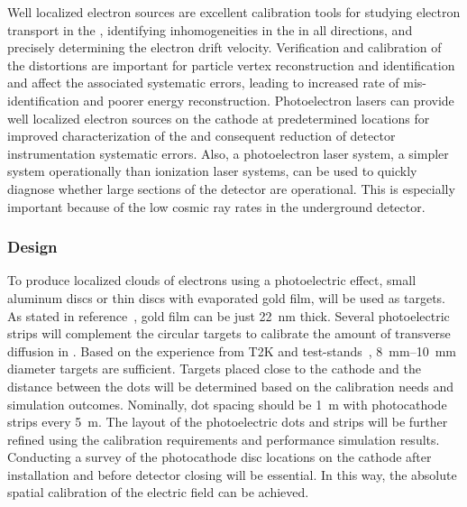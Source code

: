 Well localized electron sources are excellent calibration tools for studying electron transport in the , identifying inhomogeneities in the \efield in all directions, and precisely determining the electron drift velocity. Verification and calibration of the \efield distortions are important for particle vertex reconstruction and identification and affect the associated systematic errors, leading to increased rate of mis-identification and poorer energy reconstruction. Photoelectron lasers can provide well localized electron sources on the cathode at predetermined locations for improved characterization of the \efield and consequent reduction of detector instrumentation systematic errors. Also, a photoelectron laser system, a simpler system operationally than ionization laser systems, can be used to quickly diagnose whether large sections of the detector are operational.
This is especially important because of the low cosmic ray rates in the underground detector. 

\subsubsection{Design}
\label{sec:dp-calib-sys-las-pe-des}

To produce localized clouds of electrons using a photoelectric effect, small aluminum discs or thin discs with evaporated gold film, will be used as targets. As stated in reference~\cite{Li:2016ods}, gold film can be just \SI{22}{\nano\m} thick. Several photoelectric strips will complement the circular targets to calibrate the amount of transverse diffusion in . Based on the experience from T2K and   test-stands~\cite{Li:2016ods}, \SIrange{8}{10}{\milli\m} diameter targets are sufficient. Targets placed close to the cathode and the distance between the dots will be determined based on the calibration needs and simulation outcomes. Nominally, dot spacing should be \SI{1}{\m} with photocathode strips every \SI{5}{\m}. The layout of the photoelectric dots and strips will be further refined using the calibration requirements and performance simulation results.  Conducting a survey of the photocathode disc locations on the cathode  after installation and before detector closing will be essential. In this way, the absolute spatial calibration of the electric field can be achieved.


